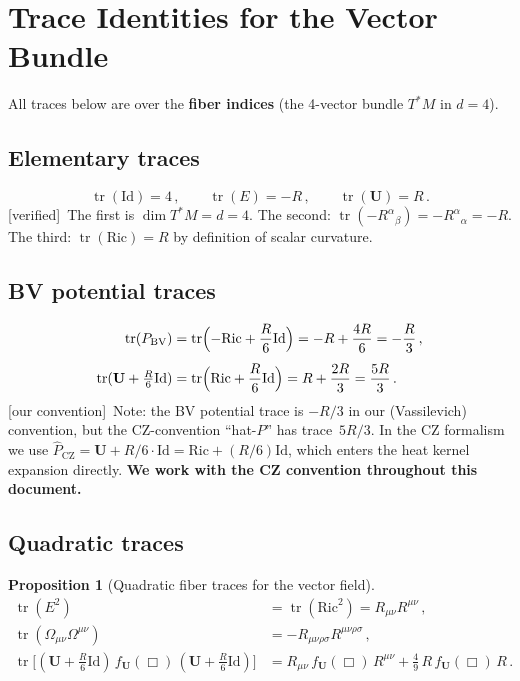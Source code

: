 \documentclass[12pt,a4paper]{article}
\newtheorem{proposition}{Proposition}[section]
\theoremstyle{definition}
\theoremstyle{remark}
\newcommand{\tr}{\operatorname{tr}}
\newcommand{\Rsq}{R_{\mu\nu\rho\sigma}R^{\mu\nu\rho\sigma}}
\newcommand{\Ricsq}{R_{\mu\nu}R^{\mu\nu}}
\newcommand{\Id}{\mathrm{Id}}
\newcommand{\oursign}{\textcolor{teal!80!black}{\textsf{[our convention]}}}
\newcommand{\verified}{\textcolor{green!50!black}{\textsf{[verified]}}}
\begin{document}
\section{Trace Identities for the Vector Bundle}
\label{sec:traces}

All traces below are over the \textbf{fiber indices} (the 4-vector
bundle $T^*M$ in $d = 4$).

\subsection{Elementary traces}

\begin{equation}
  \boxed{
  \tr(\Id) = 4\,,\qquad
  \tr(E) = -R\,,\qquad
  \tr(\mathbf{U}) = R\,.
  }
  \label{eq:traces-basic}
\end{equation}
\verified\ The first is $\dim T^*M = d = 4$.
The second: $\tr(-R^\alpha{}_\beta) = -R^\alpha{}_\alpha = -R$.
The third: $\tr(\mathrm{Ric}) = R$ by definition of scalar curvature.

\subsection{BV potential traces}

\begin{align}
  \tr(P_{\mathrm{BV}})
  &= \tr\Bigl(-\mathrm{Ric} + \frac{R}{6}\Id\Bigr)
  = -R + \frac{4R}{6}
  = -\frac{R}{3}\,,
  \label{eq:tr-PBV}\\[4pt]
  \tr(\mathbf{U} + \tfrac{R}{6}\Id)
  &= \tr\Bigl(\mathrm{Ric} + \frac{R}{6}\Id\Bigr)
  = R + \frac{2R}{3}
  = \frac{5R}{3}\,.
  \label{eq:tr-hatP-CZ}
\end{align}
\oursign\ Note: the BV potential trace is $-R/3$ in our (Vassilevich)
convention, but the CZ-convention ``hat-$P$'' has
trace~$5R/3$.  In the CZ formalism we use
$\hat{P}_{\mathrm{CZ}} = \mathbf{U} + R/6\cdot\Id
= \mathrm{Ric} + (R/6)\Id$,
which enters the heat kernel expansion directly.
\textbf{We work with the CZ convention throughout this document.}


\subsection{Quadratic traces}

\begin{proposition}[Quadratic fiber traces for the vector field]
\label{prop:quad-traces}
\begin{align}
  \tr(E^2) &= \tr(\mathrm{Ric}^2) = \Ricsq\,,
  \label{eq:tr-E2}\\[4pt]
  \tr(\Omega_{\mu\nu}\Omega^{\mu\nu})
  &= -\Rsq\,,
  \label{eq:tr-OmOm}\\[4pt]
  \tr\bigl[(\mathbf{U}+\tfrac{R}{6}\Id)\,f_{\mathbf{U}}(\Box)\,
    (\mathbf{U}+\tfrac{R}{6}\Id)\bigr]
  &= R_{\mu\nu}\,f_{\mathbf{U}}(\Box)\,R^{\mu\nu}
  + \frac{4}{9}\,R\,f_{\mathbf{U}}(\Box)\,R\,.
  \label{eq:tr-hatP-fU-hatP}
\end{align}
\end{proposition}
\end{document}
